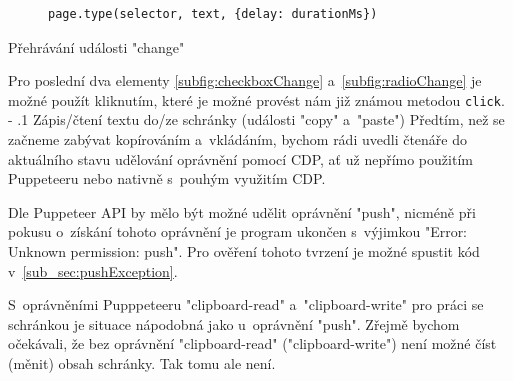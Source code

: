 \documentclass[12pt, a4paper, twoside]{article}
\makeatletter
\renewcommand\paragraph{%
	\@startsection{subparagraph}{5}{0mm}%
	{-\baselineskip}%
	{.1\baselineskip}%
	{\normalfont\normalsize\bfseries}}
\makeatother
\begin{document}
	\begin{codefigure}[H] \ContinuedFloat
		\begin{subfigure}[t]{\textwidth}
			\begin{lstlisting}[style=MyJavaScript]
page.type(selector, text, {delay: durationMs})
			\end{lstlisting}
			\caption{}
		\end{subfigure}
	\caption{Přehrávání události "change"}
	\end{codefigure}
	Pro poslední dva elementy \cref{subfig:checkboxChange} a~\ref{subfig:radioChange} je možné použít kliknutím, které je možné provést nám již známou metodou \texttt{click}. 
	\paragraph{Zápis/čtení textu do/ze schránky (události "copy" a~"paste")}
	Předtím, než se začneme zabývat kopírováním a~vkládáním, bychom rádi uvedli čtenáře do aktuálního stavu udělování oprávnění pomocí CDP, ať už nepřímo použitím Puppeteeru nebo nativně s~pouhým využitím CDP.
	
	Dle Puppeteer API by mělo být možné udělit oprávnění "push", nicméně při pokusu o~získání tohoto oprávnění je program ukončen s~výjimkou "Error: Unknown permission: push". Pro ověření tohoto tvrzení je možné spustit kód v~\ref{sub_sec:pushException}.
	
	S~oprávněními Pupppeteeru "clipboard-read" a~"clipboard-write" pro práci se schránkou je situace nápodobná jako u~oprávnění "push". Zřejmě bychom očekávali, že bez oprávnění "clipboard-read" ("clipboard-write") není možné číst (měnit) obsah schránky. Tak tomu ale není.
	
\end{document}
